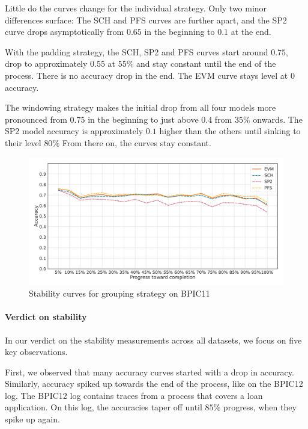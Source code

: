 Little do the curves change for the individual strategy.
Only two minor differences surface: The SCH and PFS curves are further apart, and the SP2 curve drops asymptotically from $0.65$ in the beginning to $0.1$ at the end.

With the padding strategy, the SCH, SP2 and PFS curves start around $0.75$, drop to approximately $0.55$ at $55\%$ and stay constant until the end of the process.
There is no accuracy drop in the end.
The EVM curve stays level at $0$ accuracy.

The windowing strategy makes the initial drop from all four models more pronounced from $0.75$ in the beginning to just above $0.4$ from $35\%$ onwards.
The SP2 model accuracy is approximately $0.1$ higher than the others until sinking to their level $80\%$
From there on, the curves stay constant.

\begin{figure}[!htb]
    \centering
    \includegraphics[width=\textwidth]{gfx/bpic2011/grouped_stability.pdf}
    \caption{Stability curves for grouping strategy on BPIC11}
    \label{fig:bpic11-grouped-stability}
\end{figure}

\paragraph{Verdict on stability}
In our verdict on the stability measurements across all datasets, we focus on five key observations.

First, we observed that many accuracy curves started with a drop in accuracy.
Similarly, accuracy spiked up towards the end of the process, like on the BPIC12 log.
The BPIC12 log contains traces from a process that covers a loan application.
On this log, the accuracies taper off until $85\%$ progress, when they spike up again.

